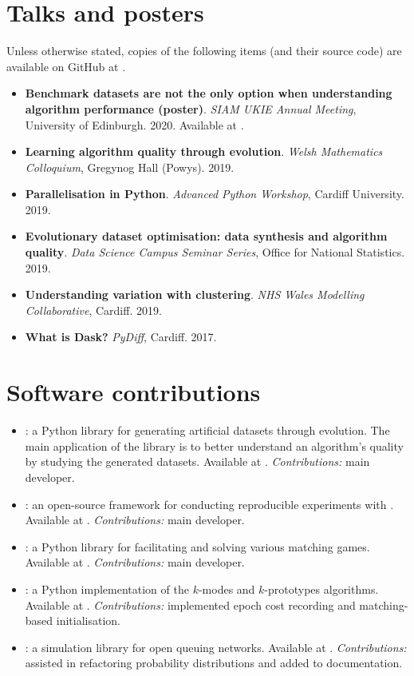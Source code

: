 \section*{Talks and posters}

Unless otherwise stated, copies of the following items (and their source code)
are available on GitHub at .

\begin{itemize}
    \item \textbf{Benchmark datasets are not the only option when understanding
        algorithm performance (poster)}. \emph{SIAM UKIE Annual Meeting},
        University of Edinburgh. 2020. Available at
        . 
    \item \textbf{Learning algorithm quality through evolution}. \emph{Welsh
        Mathematics Colloquium}, Gregynog Hall (Powys). 2019.
    \item \textbf{Parallelisation in Python}. \emph{Advanced Python Workshop},
        Cardiff University. 2019.
    \item \textbf{Evolutionary dataset optimisation: data synthesis and
        algorithm quality}. \emph{Data Science Campus Seminar Series}, Office
        for National Statistics. 2019.
    \item \textbf{Understanding variation with clustering}. \emph{NHS Wales
        Modelling Collaborative}, Cardiff. 2019.
    \item \textbf{What is Dask?} \emph{PyDiff}, Cardiff. 2017.
\end{itemize}

\section*{Software contributions}

\begin{itemize}
    \item \edo: a Python library for generating artificial datasets through
        evolution. The main application of the library is to better understand
        an algorithm's quality by studying the generated datasets. Available
        at . \emph{Contributions:} main developer.
    \item \edolab: an open-source framework for conducting reproducible
        experiments with \edo. Available at .
        \emph{Contributions:} main developer.
    \item \matching: a Python library for facilitating and solving various
        matching games. Available at .
        \emph{Contributions:} main developer.
    \item \kmodes: a Python implementation of the \(k\)-modes and
        \(k\)-prototypes algorithms. Available at .
        \emph{Contributions:} implemented epoch cost recording and matching-based
        initialisation.
    \item \ciw: a simulation library for open queuing networks. Available at
        . \emph{Contributions:} assisted in refactoring
        probability distributions and added to documentation.
\end{itemize}
